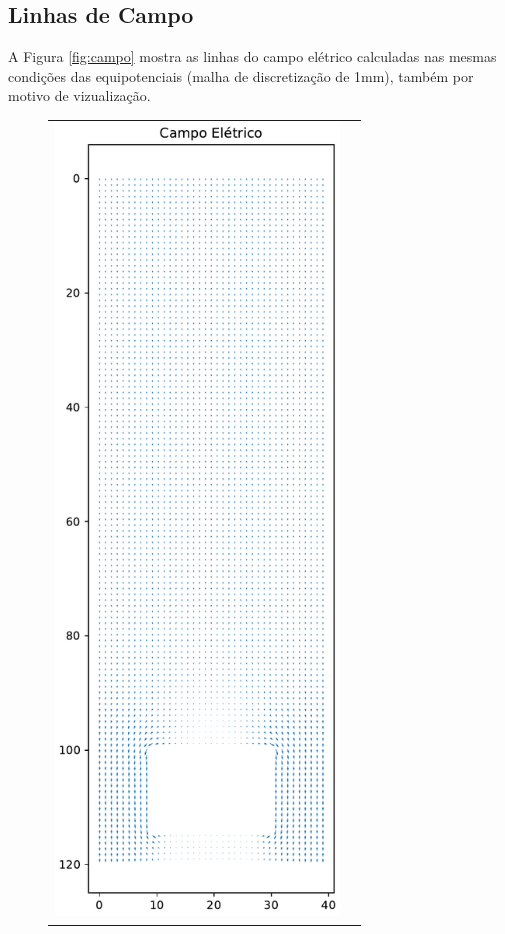 \documentclass{aleph-revista}
\begin{document}
\newpage
\subsection{Linhas de Campo}

A Figura \ref{fig:campo} mostra as linhas do campo elétrico calculadas nas mesmas condições das equipotenciais (malha de discretização de 1mm), também por motivo de vizualização.

\begin{figure}[!ht]
  \centering
  \begin{tabular}{cc}
    \includegraphics[height=210mm]{p1_campo_eletrico} &

\end{tabular}
\end{figure}
\end{document}
